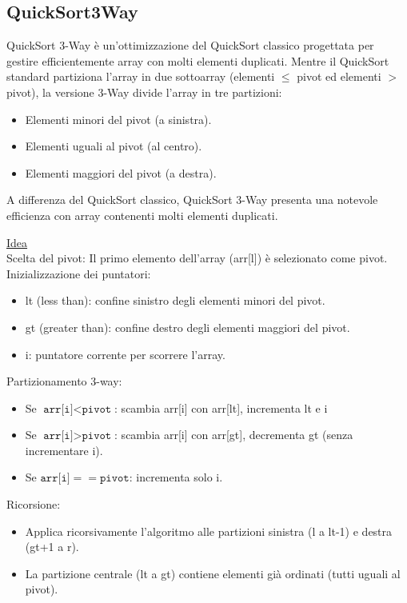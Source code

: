 \documentclass[a4paper, 11pt]{article}
\begin{document}
\subsection{QuickSort3Way}
QuickSort 3-Way è un'ottimizzazione del QuickSort classico progettata per gestire efficientemente array con molti elementi duplicati.  
Mentre il QuickSort standard partiziona l'array in due sottoarray (elementi $\leq$ pivot ed elementi $> $ pivot), la versione 3-Way divide l'array in tre partizioni:
\begin{itemize}
  \item Elementi minori del pivot (a sinistra).
  \item Elementi uguali al pivot (al centro).
  \item Elementi maggiori del pivot (a destra).
\end{itemize}
A differenza del QuickSort classico, QuickSort 3-Way presenta una notevole efficienza con array contenenti molti elementi duplicati.  
\bigbreak

\noindent  \underline{Idea} \\ Scelta del pivot: Il primo elemento dell'array (arr[l]) è selezionato come pivot.\\
Inizializzazione dei puntatori:
\begin{itemize}[-]
    \item lt (less than): confine sinistro degli elementi minori del pivot.
    \item gt (greater than): confine destro degli elementi maggiori del pivot.
    \item i: puntatore corrente per scorrere l'array.
\end{itemize}

\noindent Partizionamento 3-way:
\begin{itemize}[-]
    \item Se $ \texttt{arr[i]} < \texttt{pivot} $: scambia arr[i] con arr[lt], incrementa lt e i
    \item Se $ \texttt{arr[i]} > \texttt{pivot} $: scambia arr[i] con arr[gt], decrementa gt (senza incrementare i).
    \item Se $ \texttt{arr[i]} == \texttt{pivot} $: incrementa solo i.
\end{itemize}

\noindent Ricorsione:
\begin{itemize}[-]
    \item Applica ricorsivamente l'algoritmo alle partizioni sinistra (l a lt-1) e destra (gt+1 a r).
    \item La partizione centrale (lt a gt) contiene elementi già ordinati (tutti uguali al pivot).
\end{itemize}
\end{document}
